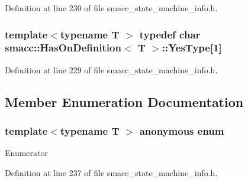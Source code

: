 Definition at line 230 of file smacc\+\_\+state\+\_\+machine\+\_\+info.\+h.

\subsubsection[{\texorpdfstring{Yes\+Type}{YesType}}]{\setlength{\rightskip}{0pt plus 5cm}template$<$typename T $>$ typedef char {\bf smacc\+::\+Has\+On\+Definition}$<$ T $>$\+::Yes\+Type\mbox{[}1\mbox{]}\hspace{0.3cm}{\ttfamily [private]}}\hypertarget{classsmacc_1_1HasOnDefinition_af147416543b9d5a19d3dfc4f3f0d42a6}{}\label{classsmacc_1_1HasOnDefinition_af147416543b9d5a19d3dfc4f3f0d42a6}


Definition at line 229 of file smacc\+\_\+state\+\_\+machine\+\_\+info.\+h.



\subsection{Member Enumeration Documentation}
\subsubsection[{\texorpdfstring{anonymous enum}{anonymous enum}}]{\setlength{\rightskip}{0pt plus 5cm}template$<$typename T $>$ anonymous enum}\hypertarget{classsmacc_1_1HasOnDefinition_a5bbbdf43322ac6428797ff51c8a78f3a}{}\label{classsmacc_1_1HasOnDefinition_a5bbbdf43322ac6428797ff51c8a78f3a}
\begin{Desc}
\item[Enumerator]\par
\begin{description}
\item[{\em 
value\hypertarget{classsmacc_1_1HasOnDefinition_a5bbbdf43322ac6428797ff51c8a78f3aa0ee3bd0e07973c128ab64f02600c7720}{}\label{classsmacc_1_1HasOnDefinition_a5bbbdf43322ac6428797ff51c8a78f3aa0ee3bd0e07973c128ab64f02600c7720}
}]\end{description}
\end{Desc}


Definition at line 237 of file smacc\+\_\+state\+\_\+machine\+\_\+info.\+h.


